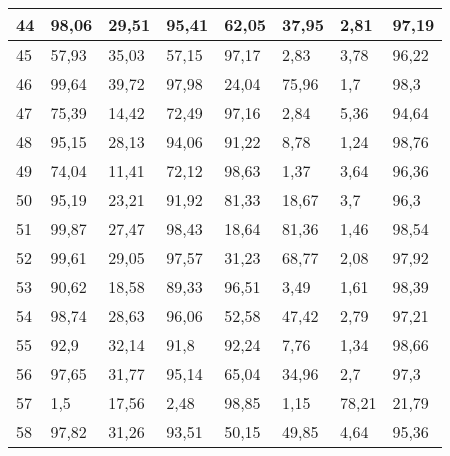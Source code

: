 \begin{longtable}[c]{|l|l|l|l|l|l|l|l|}
44              & 98,06        & 29,51        & 95,41       & 62,05         & 37,95         & 2,81          & 97,19         \\ \hline
45              & 57,93        & 35,03        & 57,15       & 97,17         & 2,83          & 3,78          & 96,22         \\ \hline
46              & 99,64        & 39,72        & 97,98       & 24,04         & 75,96         & 1,7           & 98,3          \\ \hline
47              & 75,39        & 14,42        & 72,49       & 97,16         & 2,84          & 5,36          & 94,64         \\ \hline
48              & 95,15        & 28,13        & 94,06       & 91,22         & 8,78          & 1,24          & 98,76         \\ \hline
49              & 74,04        & 11,41        & 72,12       & 98,63         & 1,37          & 3,64          & 96,36         \\ \hline
50              & 95,19        & 23,21        & 91,92       & 81,33         & 18,67         & 3,7           & 96,3          \\ \hline
51              & 99,87        & 27,47        & 98,43       & 18,64         & 81,36         & 1,46          & 98,54         \\ \hline
52              & 99,61        & 29,05        & 97,57       & 31,23         & 68,77         & 2,08          & 97,92         \\ \hline
53              & 90,62        & 18,58        & 89,33       & 96,51         & 3,49          & 1,61          & 98,39         \\ \hline
54              & 98,74        & 28,63        & 96,06       & 52,58         & 47,42         & 2,79          & 97,21         \\ \hline
55              & 92,9         & 32,14        & 91,8        & 92,24         & 7,76          & 1,34          & 98,66         \\ \hline
56              & 97,65        & 31,77        & 95,14       & 65,04         & 34,96         & 2,7           & 97,3          \\ \hline
57              & 1,5          & 17,56        & 2,48        & 98,85         & 1,15          & 78,21         & 21,79         \\ \hline
58              & 97,82        & 31,26        & 93,51       & 50,15         & 49,85         & 4,64          & 95,36         \\ \hline

\end{longtable}
